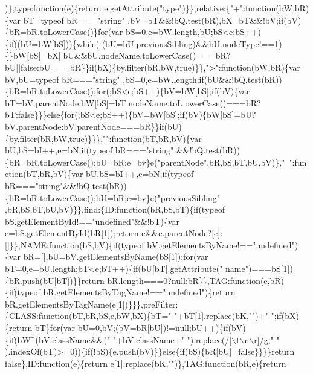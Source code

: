 \begin{DoxyCode}
{      )\},type:function(e)\{return e.getAttribute("}type\textcolor{stringliteral}{")\}\},relative:\{"}+\textcolor{stringliteral}{":function(bW,bR)\{var bT=typeof bR==="}\textcolor{keywordtype}{string}\textcolor{stringliteral}{"
      ,bV=bT&&!bQ.test(bR),bX=bT&&!bV;if(bV)\{bR=bR.toLowerCase()\}for(var
       bS=0,e=bW.length,bU;bS<e;bS++)\{if((bU=bW[bS]))\{while(
      (bU=bU.previousSibling)&&bU.nodeType!==1)\{\}bW[bS]=bX||bU&&bU.nodeName.toLowerCase()===bR?bU||false:bU===bR\}\}if(bX)\{by.filter(bR,bW,true)\}\},"}>\textcolor{stringliteral}{":function(bW,bR)\{var bV,bU=typeof bR==="}\textcolor{keywordtype}{string}\textcolor{stringliteral}{"
      ,bS=0,e=bW.length;if(bU&&!bQ.test(bR))\{bR=bR.toLowerCase();for(;bS<e;bS++)\{bV=bW[bS];if(bV)\{var
       bT=bV.parentNode;bW[bS]=bT.nodeName.toL
      owerCase()===bR?bT:false\}\}\}else\{for(;bS<e;bS++)\{bV=bW[bS];if(bV)\{bW[bS]=bU?bV.parentNode:bV.parentNode===bR\}\}if(bU)\{by.filter(bR,bW,true)\}\}\},"}\textcolor{stringliteral}{":function(bT,bR,bV)\{var bU,bS=bI++,e=bN;if(typeof bR==="}\textcolor{keywordtype}{string}\textcolor{stringliteral}{"
      &&!bQ.test(bR))\{bR=bR.toLowerCase();bU=bR;e=bv\}e("}parentNode\textcolor{stringliteral}{",bR,bS,bT,bU,bV)\},"}~\textcolor{stringliteral}{":function(bT,bR,bV)\{var
       bU,bS=bI++,e=bN;if(typeof bR==="}\textcolor{keywordtype}{string}\textcolor{stringliteral}{"&&!bQ.test(bR))\{bR=bR.toLowerCase();bU=bR;e=bv\}e("}previousSibling\textcolor{stringliteral}{"
      ,bR,bS,bT,bU,bV)\}\},find:\{ID:function(bR,bS,bT)\{if(typeof bS.getElementById!=="}undefined\textcolor{stringliteral}{"&&!bT)\{var
       e=bS.getElementById(bR[1]);return e&&e.parentNode?[e]:[]\}\},NAME:function(bS,bV)\{if(typeof bV.getElementsByName!=="}undefined\textcolor{stringliteral}{")\{var
       bR=[],bU=bV.getElementsByName(bS[1]);for(var bT=0,e=bU.length;bT<e;bT++)\{if(bU[bT].getAttribute("}
      name\textcolor{stringliteral}{")===bS[1])\{bR.push(bU[bT])\}\}return bR.length===0?null:bR\}\},TAG:function(e,bR)\{if(typeof
       bR.getElementsByTagName!=="}undefined\textcolor{stringliteral}{")\{return
       bR.getElementsByTagName(e[1])\}\}\},preFilter:\{CLASS:function(bT,bR,bS,e,bW,bX)\{bT="} \textcolor{stringliteral}{"+bT[1].replace(bK,"}\textcolor{stringliteral}{")+"} \textcolor{stringliteral}{";if(bX)\{return bT\}for(var
       bU=0,bV;(bV=bR[bU])!=null;bU++)\{if(bV)\{if(bW^(bV.className&&("} \textcolor{stringliteral}{"+bV.className+"} \textcolor{stringliteral}{").replace(/[\(\backslash\)t\(\backslash\)n\(\backslash\)r]/g,"} \textcolor{stringliteral}{"
      ).indexOf(bT)>=0))\{if(!bS)\{e.push(bV)\}\}else\{if(bS)\{bR[bU]=false\}\}\}\}return false\},ID:function(e)\{return e[1].replace(bK,"}\textcolor{stringliteral}{")\},TAG:function(bR,e)\{return
}
\end{DoxyCode}
